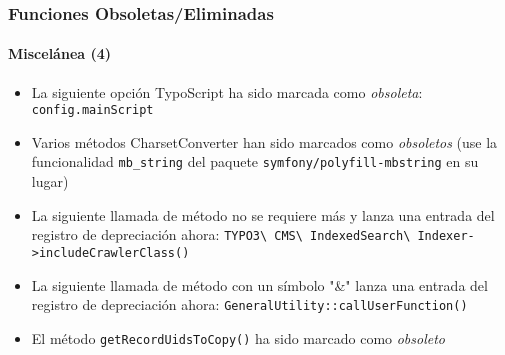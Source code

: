 \begin{frame}[fragile]
	\frametitle{Funciones Obsoletas/Eliminadas}
	\framesubtitle{Miscelánea (4)}


	\begin{itemize}

		\item La siguiente opción TypoScript ha sido marcada como \textit{obsoleta}:\newline
			\texttt{config.mainScript}

		\item Varios métodos CharsetConverter han sido marcados como \textit{obsoletos}\newline
			\small
				(use la funcionalidad \texttt{mb\_string} del paquete \texttt{symfony/polyfill-mbstring}
				en su lugar)
			\normalsize

		\item La siguiente llamada de método no se requiere más y lanza una entrada del registro de depreciación ahora:
			\small\texttt{TYPO3\textbackslash
				CMS\textbackslash
				IndexedSearch\textbackslash
				Indexer->includeCrawlerClass()}
			\normalsize

		\item La siguiente llamada de método con un símbolo "\&" lanza una entrada del registro de depreciación ahora:
			\small\texttt{GeneralUtility::callUserFunction()}\normalsize

		\item El método \texttt{getRecordUidsToCopy()} ha sido marcado como \textit{obsoleto}

	\end{itemize}

\end{frame}









